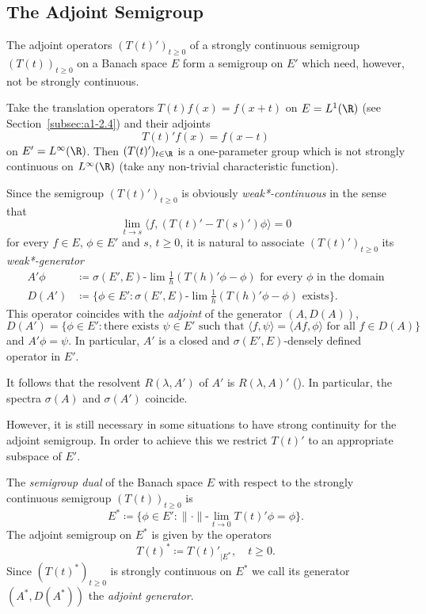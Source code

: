 \subsection{The Adjoint Semigroup}\label{subsec:a1-3.5}%
The adjoint operators $(T(t)')_{t \geq 0}$ of a strongly continuous semigroup $(T(t))_{t \geq 0}$ on a Banach space $E$ form a semigroup on $E'$ which need, however, not be strongly continuous.
\begin{example*}\label{ex:a1-3.2}
Take the translation operators $T(t)f(x) = f(x+t)$ on $E = L^{1}(\R)$ (see Section~\ref{subsec:a1-2.4}) and their adjoints
\[
    T(t)'f(x) = f(x-t)
\]
on $E' = L^{\infty}(\R)$.
Then $(T(t)')_{t \in \R}$ is a one-parameter group which is not strongly continuous on $L^{\infty}(\R)$ (take any non-trivial characteristic function).
\end{example*}

Since the semigroup $(T(t)')_{t \geq 0}$ is 
obviously \emph{weak*-continuous} in the sense that 
\[
\lim_{t \to s} \langle f,(T(t)'-T(s)')\phi \rangle = 0
\]
for every $f \in E$, $\phi \in E'$ and $s$, $t \geq 0$, it is natural to associate $(T(t)')_{t \geq 0}$ its  \emph{weak*-generator}
\begin{align*}
    A'\phi &\coloneqq \sigma(E',E)\text{-}\lim\frac{1}{h}(T(h)'\phi-\phi) \text{ for every } \phi \text{ in the domain} \\
    D(A') &\coloneqq \{\phi \in E' \colon \sigma(E',E)\text{-}\lim\frac{1}{h}(T(h)'\phi-\phi) \text{ exists}\}.
\end{align*}
This operator coincides with the \emph{adjoint} of the generator $(A,D(A))$, \ie
\[
    D(A') = \{\phi \in E' \colon \text{there exists } \psi \in E' \text{ such that } \langle f,\psi \rangle = \langle Af,\phi \rangle \text{ for all } f \in D(A)\}
\]
and $A'\phi = \psi$.
In particular, $A'$ is a closed and $\sigma(E',E)$-densely defined operator in $E'$.

It follows that the resolvent $R(\lambda,A')$ of\/ $A'$ is $R(\lambda,A)'$ 
(\textcite[Theorem~III.5.30]{kato:1976}).
In particular, the spectra $\sigma(A)$ and $\sigma(A')$ coincide.

However, it is still necessary in some situations to have strong continuity for the adjoint semigroup.
In order to achieve this we restrict $T(t)'$ to an appropriate subspace of\/ $E'$.
\begin{definition*}\label{def:a1-3.1}
The \emph{semigroup dual} of the Banach space $E$ with respect to the strongly continuous semigroup $(T(t))_{t \geq 0}$ is
\[
    E^{*} \coloneqq \{\phi \in E' \colon \|\cdot\|\text{-}\lim_{t \to 0} T(t)'\phi = \phi\}.
\]
The adjoint semigroup on $E^{*}$ is given by the operators
\[
    T(t)^{*} \coloneqq T(t)'_{ \vert E^{*}}, \quad t \geq 0.
\]
Since $(T(t)^{*})_{t \geq 0}$ is strongly continuous on $E^{*}$ we call its generator $(A^{*},D(A^{*}))$ the \emph{adjoint generator}.
\end{definition*}

